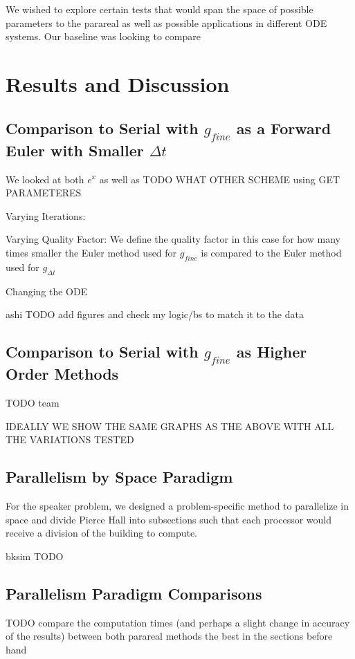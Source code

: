 \documentclass[letterpaper,11pt]{article}
\begin{document}
We wished to explore certain tests that would span the space of possible
parameters to the parareal as well as possible applications in different ODE
systems. Our baseline was looking to compare 

\section{Results and Discussion}

\subsection{Comparison to Serial with $g_{fine}$ as a Forward Euler with
Smaller $\Delta t$}

We looked at both $e^x$ as well as TODO WHAT OTHER SCHEME using GET PARAMETERES

Varying Iterations:

Varying Quality Factor:
We define the quality factor in this case for how many times smaller the Euler method used for $g_{fine}$ is compared to the Euler method used for $g_{\Delta t}$

Changing the ODE

ashi TODO add figures and check my logic/bs to match it to the data

\subsection{Comparison to Serial with $g_{fine}$ as Higher Order Methods}

TODO team

IDEALLY WE SHOW THE SAME GRAPHS AS THE ABOVE WITH ALL THE VARIATIONS TESTED

\subsection{Parallelism by Space Paradigm}

For the speaker problem, we designed a problem-specific method to parallelize in space and divide Pierce Hall into subsections such that each processor would receive a division of the building to compute.

bksim TODO

\subsection{Parallelism Paradigm Comparisons}

TODO compare the computation times (and perhaps a slight change in accuracy of the results) between both parareal methods the best in the sections before hand
\end{document}
